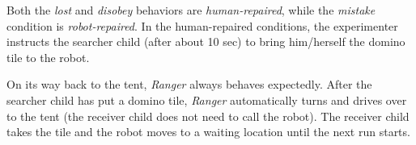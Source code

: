 \documentclass[letterpaper, 10pt, conference]{ieeeconf}
\begin{document}
%
%
%
%


Both the \textit{lost} and \emph{disobey} behaviors are \textit{human-repaired},
while the \emph{mistake} condition is \emph{robot-repaired}. In the
human-repaired conditions, the experimenter instructs the searcher child (after
about 10 sec) to bring him/herself the domino tile to the robot.

On its way back to the tent, \emph{Ranger} always behaves expectedly. After the
searcher child has put a domino tile, \emph{Ranger} automatically turns and
drives over to the tent (the receiver child does not need to call the robot).
The receiver child takes the tile and the robot moves to a waiting location
until the next run starts.
\end{document}
